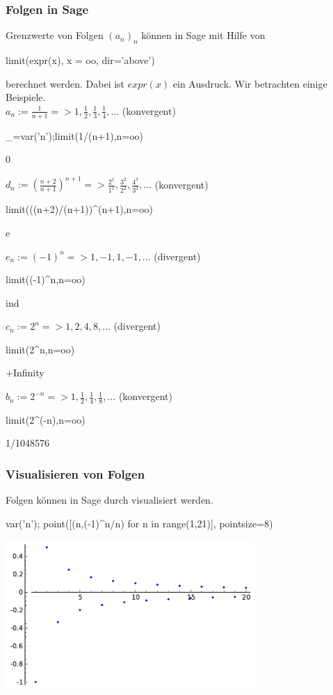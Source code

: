 \documentclass[fontsize=12pt,paper=a4,twoside,bibtotoc,idxtotoc,
liststotoc,pagesize,BCOR1.2cm,DIV15,chapterprefix,pagesize=pdftex]{scrbook}
\theoremstyle{plain}
\theoremstyle{definition}
\theoremstyle{remark}
\begin{document}
\subsubsection{Folgen in Sage}
Grenzwerte von Folgen $(a_n)_n$ können in Sage mit Hilfe von 
\begin{sagein}
limit(expr(x), x = oo, dir='above')
\end{sagein}
berechnet werden. Dabei ist $expr(x)$ ein Ausdruck.
Wir betrachten einige Beispiele.\\
$a_n:= \frac{1}{n+1} => 1, \frac{1}{2}, \frac{1}{3}, \frac{1}{4}, \ldots$  (konvergent)
\begin{sagein}
_=var('n');limit(1/(n+1),n=oo)
\end{sagein}
\begin{sage}
  0
\end{sage}
 $d_n:=\left( \frac{n+2}{n+1} \right)^{n+1} => \frac{2^1}{1^1},\frac{3^2}{2^2}, \frac{4^3}{3^3},...$ (konvergent)
\begin{sagein}
limit(((n+2)/(n+1))^(n+1),n=oo)
\end{sagein}
\begin{sage}
  e
\end{sage}
 $e_n:=(-1)^n => 1,-1,1,-1,...$ (divergent)
\begin{sagein}
limit((-1)^n,n=oo)
\end{sagein}
\begin{sage}
  ind
\end{sage}
 $c_n:=2^n => 1,2,4,8,\ldots$ (divergent)
\begin{sagein}
limit(2^n,n=oo)
\end{sagein}
\begin{sage}
  +Infinity
\end{sage}
  $b_n:= 2^{-n} => 1,\frac{1}{2}, \frac{1}{4}, \frac{1}{8}, \ldots$ (konvergent)
\begin{sagein}
limit(2^(-n),n=oo)
\end{sagein}
\begin{sage}
  1/1048576
\end{sage}
\subsubsection{Visualisieren von Folgen}
Folgen können in Sage durch {\color{blue} } visualisiert werden.
\begin{sagein}
var('n');
point([(n,(-1)^n/n) for n in range(1,21)], pointsize=8)
\end{sagein}
\begin{center}
\includegraphics[width=9.5cm]{folge.pdf}
\end{center}
\end{document}
